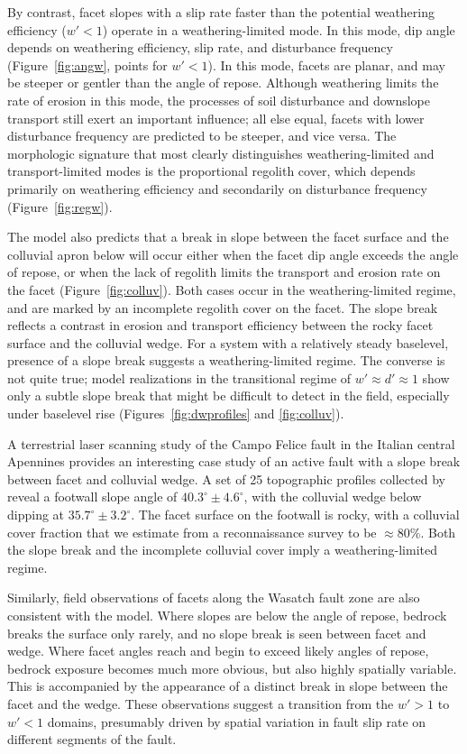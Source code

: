 By contrast, facet slopes with a slip rate faster than the potential weathering efficiency ($w'<1$) operate in a weathering-limited mode. In this mode, dip angle depends on weathering efficiency, slip rate, and disturbance frequency (Figure~\ref{fig:angw}, points for $w'<1$). In this mode, facets are planar, and may be steeper or gentler than the angle of repose. Although weathering limits the rate of erosion in this mode, the processes of soil disturbance and downslope transport still exert an important influence; all else equal, facets with lower disturbance frequency are predicted to be steeper, and vice versa. The morphologic signature that most clearly distinguishes weathering-limited and transport-limited modes is the proportional regolith cover, which depends primarily on weathering efficiency and secondarily on disturbance frequency (Figure~\ref{fig:regw}).

The model also predicts that a break in slope between the facet surface and the colluvial apron below will occur either when the facet dip angle exceeds the angle of repose, or when the lack of regolith limits the transport and erosion rate on the facet (Figure~\ref{fig:colluv}).  Both cases occur in the weathering-limited regime, and are marked by an incomplete regolith cover on the facet. The slope break reflects a contrast in erosion and transport efficiency between the rocky facet surface and the colluvial wedge. For a system with a relatively steady baselevel, presence of a slope break suggests a weathering-limited regime. The converse is not quite true; model realizations in the transitional regime of $w'\approx d' \approx 1$ show only a subtle slope break that might be difficult to detect in the field, especially under baselevel rise (Figures~\ref{fig:dwprofiles} and \ref{fig:colluv}). 

A terrestrial laser scanning study of the Campo Felice fault in the Italian central Apennines provides an interesting case study of an active fault with a slope break between facet and colluvial wedge. A set of 25 topographic profiles collected by \citet{wilkinson2015slip} reveal a footwall slope angle of $40.3^\circ\pm 4.6^\circ$, with the colluvial wedge below dipping at $35.7^\circ\pm3.2^\circ$. The facet surface on the footwall is rocky, with a colluvial cover fraction that we estimate from a reconnaissance survey to be $\approx 80$\%. Both the slope break and the incomplete colluvial cover imply a weathering-limited regime. 

Similarly, field observations of facets along the Wasatch fault zone are also consistent with the model. Where slopes are below the angle of repose, bedrock breaks the surface only rarely, and no slope break is seen between facet and wedge. Where facet angles reach and begin to exceed likely angles of repose, bedrock exposure becomes much more obvious, but also highly spatially variable. This is accompanied by the appearance of a distinct break in slope between the facet and the wedge. These observations suggest a transition from the $w' > 1$ to $w' < 1$ domains, presumably driven by spatial variation in fault slip rate on different segments of the fault.

